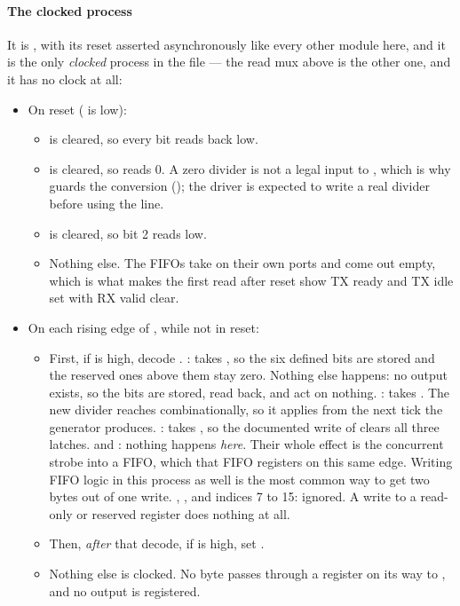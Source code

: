 \paragraph{The clocked process} It is , with its reset asserted
asynchronously like every other module here, and it is the only \emph{clocked} process in the file
--- the read mux above is the other one, and it has no clock at all:
\begin{itemize}
  \item On reset ( is low):
  \begin{itemize}
    \item {} is cleared, so every  bit reads back low.
    \item {} is cleared, so  reads 0. A zero divider is not a legal
      input to , which is why  guards the conversion
      (); the driver is expected to write a real divider before using the line.
    \item {} is cleared, so  bit 2 reads low.
    \item Nothing else. The FIFOs take  on their own ports and come out empty,
      which is what makes the first  read after reset show TX ready and TX idle set
      with RX valid clear.
  \end{itemize}
  \item On each rising edge of , while not in reset:
  \begin{itemize}
    \item First, if  is high, decode . \textbf{}:
       takes , so the six
      defined bits are stored and the reserved ones above them stay zero. Nothing else happens: no
       output exists, so the bits are stored, read back, and act on nothing.
      \textbf{}:  takes . The new
      divider reaches  combinationally, so it applies from the next tick the
      generator produces. \textbf{}:  takes
      , so the documented write of  clears all three latches.
      \textbf{} and \textbf{}: nothing happens \emph{here}. Their
      whole effect is the concurrent strobe into a FIFO, which that FIFO registers on this same
      edge. Writing FIFO logic in this process as well is the most common way to get two bytes out
      of one write. \textbf{}, \textbf{}, and indices 7 to 15:
      ignored. A write to a read-only or reserved register does nothing at all.
    \item Then, \emph{after} that decode, if  is high, set
      .
    \item Nothing else is clocked. No byte passes through a register on its way to
      , and no output is registered.
  \end{itemize}
\end{itemize}

